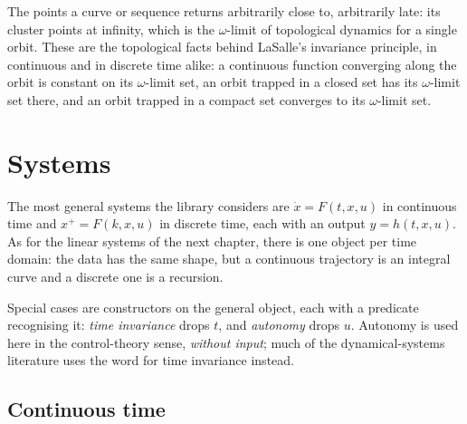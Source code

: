 The points a curve or sequence returns arbitrarily close to, arbitrarily late: its cluster
points at infinity, which is the $\omega$-limit of topological dynamics for a single orbit.
These are the topological facts behind LaSalle's invariance principle, in continuous and in
discrete time alike: a continuous function converging along the orbit is constant on its
$\omega$-limit set, an orbit trapped in a closed set has its $\omega$-limit set there, and an orbit
trapped in a compact set converges to its $\omega$-limit set.








\chapter{Systems}

The most general systems the library considers are $\dot x = F(t, x, u)$ in continuous time and
$x^{+} = F(k, x, u)$ in discrete time, each with an output $y = h(t, x, u)$. As for the linear
systems of the next chapter, there is one object per time domain: the data has the same shape, but a continuous
trajectory is an integral curve and a discrete one is a recursion.

Special cases are constructors on the general object, each with a predicate recognising it:
\emph{time invariance} drops $t$, and \emph{autonomy} drops $u$. Autonomy is used here in the
control-theory sense, \emph{without input}; much of the dynamical-systems literature uses the word
for time invariance instead.

\section{Continuous time}





